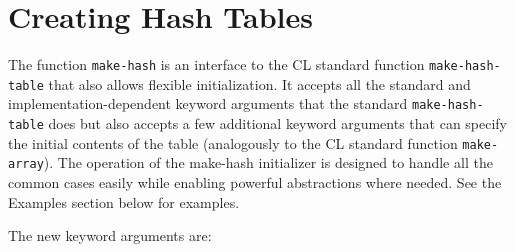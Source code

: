 \documentclass[11pt]{article}
\begin{document}
\section{Creating Hash Tables}
\label{sec-4}


  The function \texttt{make-hash} is an interface to the CL standard function
  \texttt{make-hash-table} that also allows flexible initialization. It accepts all
  the standard and implementation-dependent keyword arguments that the
  standard \texttt{make-hash-table} does but also accepts a few additional keyword
  arguments that can specify the initial contents of the table (analogously
  to the CL standard function \texttt{make-array}). The operation of the make-hash
  initializer is designed to handle all the common cases easily while
  enabling powerful abstractions where needed. See the Examples section
  below for examples.

  The new keyword arguments are:
\end{document}
